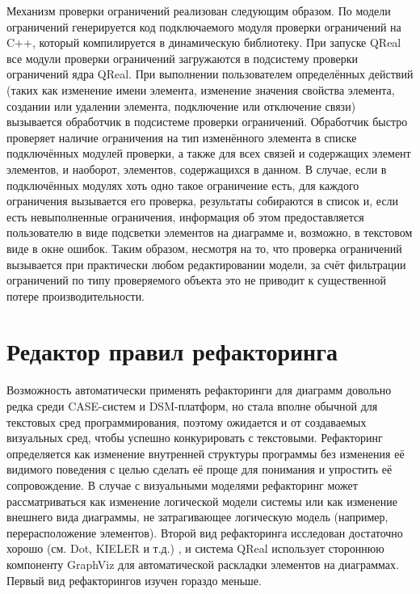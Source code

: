 Механизм проверки ограничений реализован следующим образом. По модели ограничений 
генерируется код подключаемого модуля проверки ограничений на C++, который компилируется 
в динамическую библиотеку. При запуске QReal все модули проверки ограничений загружаются 
в подсистему проверки ограничений ядра QReal. При выполнении пользователем определённых 
действий (таких как изменение имени элемента, изменение значения свойства элемента, 
создании или удалении элемента, подключение или отключение связи) вызывается обработчик 
в подсистеме проверки ограничений. Обработчик быстро проверяет наличие ограничения 
на тип изменённого элемента в списке подключённых модулей проверки, а также для всех 
связей и содержащих элемент элементов, и наоборот, элементов, содержащихся в данном. 
В случае, если в подключённых модулях хоть одно такое ограничение есть, для каждого 
ограничения вызывается его проверка, результаты собираются в список и, если есть невыполненные 
ограничения, информация об этом предоставляется пользователю в виде подсветки элементов 
на диаграмме и, возможно, в текстовом виде в окне ошибок. Таким образом, несмотря на то, 
что проверка ограничений вызывается при практически любом редактировании модели, за 
счёт фильтрации ограничений по типу проверяемого объекта это не приводит к существенной 
потере производительности.

\section{Редактор правил рефакторинга}
Возможность автоматически применять рефакторинги для диаграмм довольно редка среди 
CASE-систем и DSM-платформ, но стала вполне обычной для текстовых сред программирования, 
поэтому ожидается и от создаваемых визуальных сред, чтобы успешно конкурировать с текстовыми. 
Рефакторинг определяется как изменение внутренней структуры программы без изменения 
её видимого поведения с целью сделать её проще для понимания и упростить её сопровождение. 
В случае с визуальными моделями рефакторинг может рассматриваться как изменение логической 
модели системы или как изменение внешнего вида диаграммы, не затрагивающее логическую 
модель (например, перерасположение элементов). Второй вид рефакторинга исследован 
достаточно хорошо (см. Dot, KIELER и т.д.)
, и система QReal использует стороннюю компоненту GraphViz 
для автоматической раскладки элементов на диаграммах. Первый вид рефакторингов изучен 
гораздо меньше.

